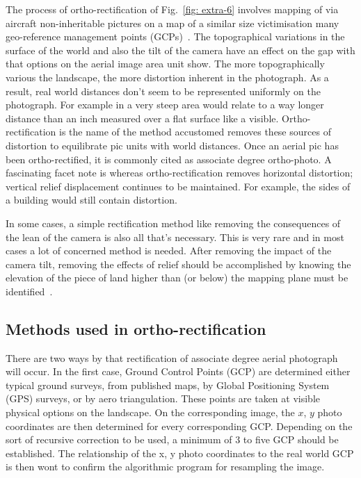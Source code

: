 The process of ortho-rectification of Fig.~\ref{fig: extra-6} involves mapping of via aircraft non-inheritable pictures on a map of a similar size victimisation many geo-reference management points (GCPs)~\cite{1}. The topographical variations in the surface of  the world and also the tilt of the camera have an effect on  the gap with that options on the aerial image area unit show. The more topographically various the landscape, the more distortion inherent in the photograph. As a result, real world distances don't seem to be represented uniformly on the photograph. For example in a very steep area would relate to a way longer distance than an inch measured over a flat surface like a visible. Ortho-rectification is the name of the method accustomed removes these sources of distortion to equilibrate pic units with world distances. Once an aerial pic has been ortho-rectified, it is commonly cited as associate degree ortho-photo. A fascinating facet note is whereas ortho-rectification removes horizontal distortion; vertical relief displacement continues to be maintained. For example, the sides of a building would still contain distortion.

In some cases, a simple rectification method like removing the consequences of the lean of the camera is also all that's necessary. This is very rare and in most cases a lot of concerned method is needed. After removing the impact of the camera tilt, removing the effects of relief should be accomplished by knowing the elevation of the piece of land higher than (or below) the mapping plane must be identified~\cite{4}.

\subsection{Methods used in ortho-rectification}
There are two ways by that rectification of associate degree aerial photograph will occur. In the first case, Ground Control Points (GCP) are determined either typical ground surveys, from published maps, by Global Positioning System (GPS) surveys, or by aero triangulation. These points are taken at visible physical options on the landscape. On the corresponding image, the $x$, $y$ photo coordinates are then determined for every corresponding GCP. Depending on the sort of recursive correction to be used, a minimum of 3 to five GCP should be established. The relationship of the x, y photo coordinates to the real world GCP is then wont to confirm the algorithmic program for resampling the image.

